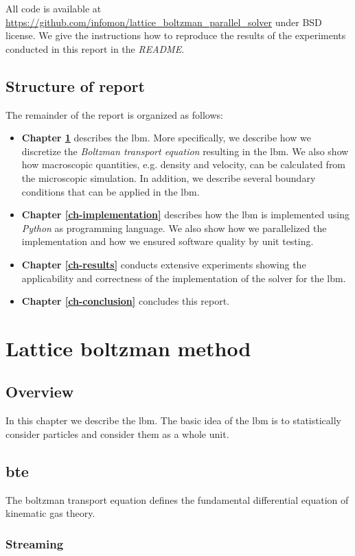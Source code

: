 \documentclass[a4paper,11pt, footsepline]{book}
\begin{document}
All code is available at \url{https://github.com/infomon/lattice_boltzman_parallel_solver} under BSD license. We give the instructions how to reproduce the results of the experiments conducted in this report in the \textit{README}.

\section*{Structure of report}
The remainder of the report is organized as follows:
\begin{itemize}
\item \textbf{Chapter \ref{ch-method}} describes the \ac{lbm}. More specifically, we describe how we discretize the \textit{Boltzman transport equation} resulting in the \ac{lbm}. We also show how macroscopic quantities, e.g. density and velocity, can be calculated from the microscopic simulation. In addition, we describe several boundary conditions that can be applied in the \ac{lbm}.
\item \textbf{Chapter \ref{ch-implementation}} describes how the \ac{lbm} is implemented using \textit{Python} as programming language. We also show how we parallelized the implementation and how we ensured software quality by unit testing.
\item \textbf{Chapter \ref{ch-results}} conducts extensive experiments showing the applicability and correctness of the implementation of the solver for the \ac{lbm}. 
\item \textbf{Chapter \ref{ch-conclusion}} concludes this report.
\end{itemize}
\chapter{Lattice boltzman method}\label{ch-method}
\section{Overview}
In this chapter we describe the \acf{lbm}. The basic idea of the \ac{lbm} is to statistically consider particles and consider them as a whole unit.
\section{\acf{bte}}\label{sec-bte}
The boltzman transport equation defines the fundamental differential equation of kinematic gas theory.
\subsection*{Streaming}
\end{document}
